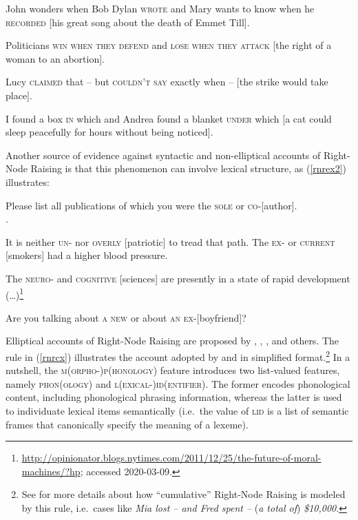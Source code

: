 {\begin{exe}
\begin{xlista}
\ex John wonders when Bob Dylan
\textsc{wrote} and Mary wants to know when
  he
\textsc{recorded} [his great song about the death of Emmet Till].
 
 \ex Politicians \textsc{win when they defend} and \textsc{lose when they attack}
[the right of a woman to an abortion].

\ex Lucy \textsc{claimed} that -- but \textsc{couldn't say}
exactly when --  $[$the strike would take place$]$.
 
 \ex I found a box \textsc{in} which and Andrea found a blanket \textsc{under}
which [a cat could sleep peacefully for hours without being
noticed].
\end{xlista}\label{rnrex1}
\end{exe}

Another source of evidence against syntactic and non-elliptical accounts of Right-Node Raising is that this phenomenon can involve lexical structure,
as  (\ref{rnrex2}) illustrates:

\begin{exe}
\ex \begin{xlista}
\ex Please list all publications of which you were the \textsc{sole} or
\textsc{co}-[author].\\
 \citep[1325, fn.\ 44]{rodney}.
 
\ex  It is neither \textsc{un}- nor \textsc{overly} [patriotic] to tread that path.
\citep[]{chaveslp} 
\ex The \textsc{ex-} or \textsc{current} [smokers] had a higher blood pressure.\\
\citep[]{chaveslp} 

\ex The \textsc{neuro}- and \textsc{cognitive} [sciences] are
presently in a state of rapid development
(\ldots{})\footnote{\url{http://opinionator.blogs.nytimes.com/2011/12/25/the-future-of-moral-machines/?hp};
  accessed 2020-03-09.}

\ex Are you talking about \textsc{a new}  or about \textsc{an ex}-[boyfriend]?\\
\citep[867]{chavesrnr}

\end{xlista}\label{rnrex2}
\end{exe}



Elliptical accounts of Right-Node Raising are proposed by \citet{Beavers},
\citet{Yatabe:04}, \citet{chavesrnr}, and others. The rule in (\ref{rnrcx}) illustrates the account adopted by 
 \citet[874]{chavesrnr}  and \citet[]{aoi}
  in simplified format.\footnote{See \citet{chavesrnr} for more details about how ``cumulative'' Right-Node Raising is modeled by this rule, i.e.\
 cases like \emph{Mia lost -- and Fred spent --} (\emph{a total of}) \emph{\$10,000}.}
In a nutshell, the \textsc{m(orpho-)p(honology)} feature introduces two list-valued features, namely \textsc{phon}(\textsc{ology}) and \textsc{l(exical-)id(entifier)}. The former encodes phonological content, including phonological phrasing information,  whereas the latter is used to individuate lexical items semantically (i.e.\  the value
of \textsc{lid} is a list of semantic frames that canonically specify the meaning of a lexeme).

}
